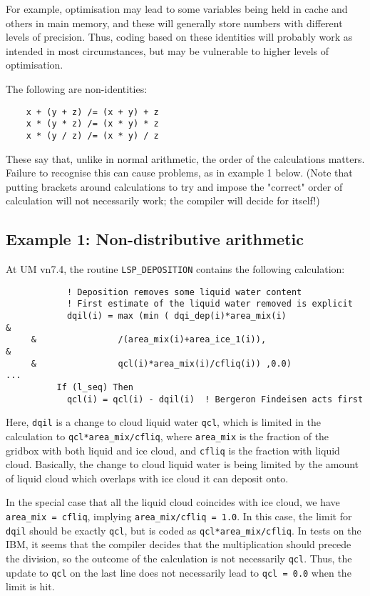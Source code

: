 For example, optimisation may lead to some variables being held in 
cache and others in main memory, and these will generally store 
numbers with different levels of precision. 
Thus, coding based on these identities will probably 
work as intended in most circumstances, but may be 
vulnerable to higher levels of optimisation.

The following are non-identities:
\begin{verbatim} 
    x + (y + z) /= (x + y) + z
    x * (y * z) /= (x * y) * z
    x * (y / z) /= (x * y) / z
\end{verbatim}

These say that, unlike in normal arithmetic, the order of the 
calculations matters. Failure to recognise this can cause problems, 
as in example 1 below. (Note that putting brackets around 
calculations to try and impose the "correct" order of calculation 
will not necessarily work; the compiler will decide for itself!)

\subsection{Example 1: Non-distributive arithmetic}
At UM vn7.4, the routine \verb|LSP_DEPOSITION| 
contains the following calculation:
\begin{verbatim} 
            ! Deposition removes some liquid water content
            ! First estimate of the liquid water removed is explicit
            dqil(i) = max (min ( dqi_dep(i)*area_mix(i)                 &
     &                /(area_mix(i)+area_ice_1(i)),                     &
     &                qcl(i)*area_mix(i)/cfliq(i)) ,0.0)
...
          If (l_seq) Then
            qcl(i) = qcl(i) - dqil(i)  ! Bergeron Findeisen acts first
\end{verbatim}
Here, \verb|dqil| is a change to cloud liquid water \verb|qcl|, 
which is limited in the calculation to \verb|qcl*area_mix/cfliq|, 
where \verb|area_mix| is the fraction of the gridbox with both liquid 
and ice cloud, and \verb|cfliq| is the fraction with liquid cloud. 
Basically, the change to cloud liquid water is being limited by 
the amount of liquid cloud which overlaps with ice cloud it can deposit onto.

In the special case that all the liquid cloud coincides with ice cloud, 
we have \verb|area_mix = cfliq|, implying \verb|area_mix/cfliq = 1.0|. 
In this case, the limit for \verb|dqil| should be exactly \verb|qcl|, 
but is coded as \verb|qcl*area_mix/cfliq|. 
In tests on the IBM, it seems that the compiler decides that the 
multiplication should precede the division, so the outcome of the 
calculation is not necessarily \verb|qcl|. 
Thus, the update to \verb|qcl| on the last line does not necessarily lead to 
\verb|qcl = 0.0| when the limit is hit.

